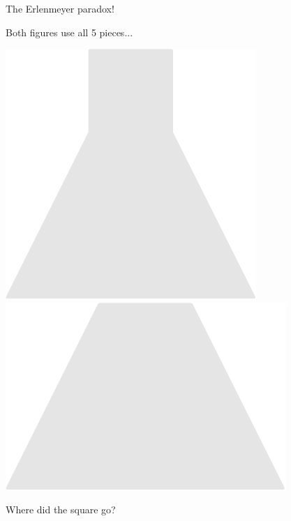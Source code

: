 \documentclass[14pt]{beamer}
\begin{document}

    \begin{frame}{The Erlenmeyer paradox!}
        \begin{center}
            Both figures use all 5 pieces...

            \vspace{8pt}

            \;\;\includegraphics[scale=0.5]{figures/figure022u.pdf}\qquad
            \qquad
            \includegraphics[scale=0.5]{figures/figure022i.pdf}\;

            \vspace{32pt}

            Where did the square go?
        \end{center}
    \end{frame}
\end{document}

